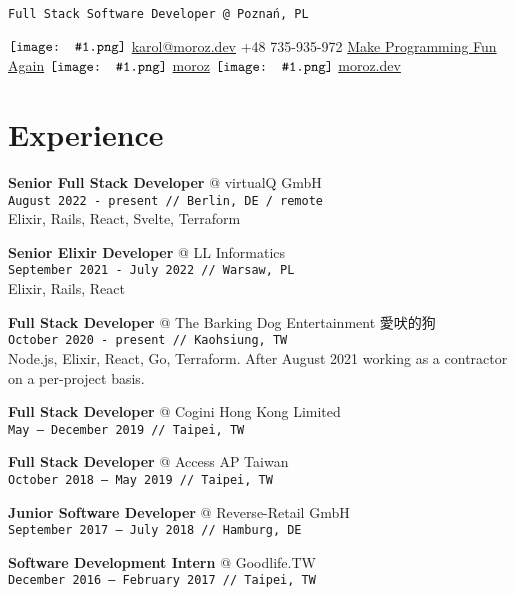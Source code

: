 \documentclass[10pt,a4paper]{article}
\author{Karol Moroz}
\makeatletter
\newcommand{\icon}[1]{$\vcenter{\hbox{\texttt{[image: \#1.png]}}}$\hspace{.2em}}
\newcommand{\experience}[4]{\par\vspace{1em}\textbf{\normalsize #1} {\color{darkgray} @ #2}\\{\footnotesize\texttt{#3 // #4}}\\[4pt]}
\makeatother
\begin{document}
\pagestyle{empty}

\texttt{Full Stack Software Developer @ Poznań, PL}

\icon{email}
\href{mailto:karol@moroz.dev}{karol@moroz.dev} \hfill
\raisebox{0.15\height}{\icon{telephone}} +48 735-935-972 \hfill
\raisebox{0.15\height}{\icon{youtube}} \href{https://www.youtube.com/channel/UCW_YiVuoo-WG0bxQElVgxAg}{Make Programming Fun Again} \hfill
\icon{github} \href{https://github.com/moroz}{moroz} \hfill
\icon{web} \href{https://moroz.dev}{moroz.dev}

\begin{minipage}[t]{0.67\textwidth}
  \raggedright

  \section{Experience}
  \vspace*{-6pt}

  \experience{Senior Full Stack Developer}{virtualQ GmbH}{August 2022 {-} present}{Berlin, DE / remote}

  Elixir, Rails, React, Svelte, Terraform

  \experience{Senior Elixir Developer}{LL Informatics}{September 2021 {-} July 2022}{Warsaw, PL}

  Elixir, Rails, React

  \experience{Full Stack Developer}{The Barking Dog Entertainment 愛吠的狗}{October 2020 {-} present}{Kaohsiung, TW}

  Node.js, Elixir, React, Go, Terraform. After August 2021 working as a contractor on a per-project basis.

  \experience{Full Stack Developer}{Cogini Hong Kong Limited}{May {–} December 2019}{Taipei, TW}

  \experience{Full Stack Developer}{Access AP Taiwan}{October 2018 {–} May 2019}{Taipei, TW}

  \experience{Junior Software Developer}{Reverse-Retail GmbH}{September 2017 {–} July 2018}{Hamburg, DE}

  \experience{Software Development Intern}{Goodlife.TW}{December 2016 {–} February 2017}{Taipei, TW}
  \vspace{1.2em}
  

\end{minipage}\hspace{0.03\textwidth}%
\end{document}
